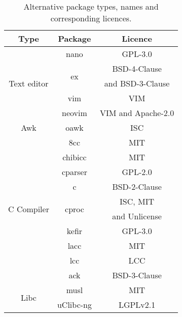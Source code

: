 
\newpage

\begin{table}[!ht]
    \centering
    \begin{tabular}{|c|c|c|}
        \hline
        Type & Package & Licence \\
        \hline
        \hline
        \multirow{5}{*}{Text editor} & nano \cite{nano} & GPL-3.0 \\
        \cline{2-3}
        & \multirow{2}{*}{ex \cite{ex-vi}} & BSD-4-Clause \footnotemark \\
        & & and BSD-3-Clause \\
        \cline{2-3}
        & vim \cite{vim} & VIM \\
        \cline{2-3}
        & neovim \cite{neovim} & VIM and Apache-2.0 \\
        \hline
        Awk & oawk \cite{oawk} & ISC \\
        \hline
        \multirow{10}{*}{C Compiler} & 8cc \cite{8cc} & MIT \\
        \cline{2-3}
        & chibicc \cite{chibicc} & MIT \\
        \cline{2-3}
        & cparser \cite{cparser} & GPL-2.0 \\
        \cline{2-3}
        & c \cite{c} & BSD-2-Clause \\
        \cline{2-3}
        & \multirow{2}{*}{cproc \cite{cproc}} & ISC, MIT \\
        & & and Unlicense \\
        \cline{2-3}
        & kefir \cite{kefir} & GPL-3.0 \\
        \cline{2-3}
        & lacc \cite{lacc} & MIT \\
        \cline{2-3}
        & lcc \cite{lcc} & LCC \footnotemark \\
        \cline{2-3}
        & ack \cite{ack} & BSD-3-Clause \\
        \hline
        \multirow{2}{*}{Libc} & musl \cite{musl} & MIT \\
        \cline{2-3}
        & uClibc-ng \cite{uclibc-ng} & LGPLv2.1 \\
        \hline
    \end{tabular}
    \caption{Alternative package types, names and corresponding licences.}
\end{table}


\newpage
